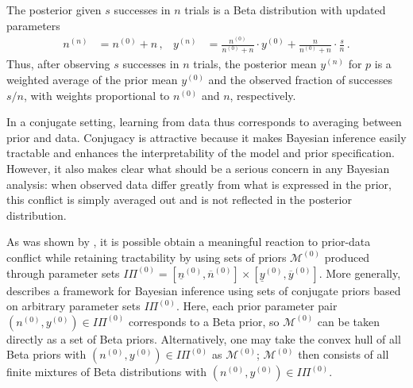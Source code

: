 \documentclass[runningheads,a4paper]{llncs}
\newcommand{\uz}{^{(0)}} %
\newcommand{\un}{^{(n)}} %
\newcommand{\ul}[1]{\underline{#1}}
\newcommand{\ol}[1]{\overline{#1}}
\def\yz{y\uz}
\def\yn{y\un}
\def\yzl{\ul{y}\uz}
\def\yzu{\ol{y}\uz}
\def\nz{n\uz}
\def\nn{n\un}
\def\nzl{\ul{n}\uz}
\def\nzu{\ol{n}\uz}
\def\PZ{I\!\!\Pi\uz}
\def\MZ{\mathcal{M}\uz}
\newcommand{\az}{\alpha\uz}
\newcommand{\bz}{\beta\uz}
\begin{document}
The posterior given $s$ successes in $n$ trials is a Beta distribution with updated parameters
\begin{align}
\nn &= \nz + n\,, &
\yn &= \frac{\nz}{\nz + n} \cdot \yz + \frac{n}{\nz + n} \cdot \frac{s}{n}\,.
\label{eq:nyupdate}
\end{align}
Thus, after observing $s$ successes in $n$ trials,
the posterior mean $\yn$ for $p$ is a weighted average of
the prior mean $\yz$ and the observed fraction of successes $s/n$,
with weights proportional to $\nz$ and $n$, respectively.

In a conjugate setting, learning from data thus corresponds to averaging between prior and data.
Conjugacy is attractive because it makes Bayesian inference easily tractable
and enhances the interpretability of the model and prior specification.
However, it also makes clear what should be a serious concern in any Bayesian analysis:
when observed data differ greatly from what is expressed in the prior,
this conflict is simply averaged out
and is not reflected in the posterior distribution.


As was shown by \cite{Walter2009a}, %
it is possible obtain a meaningful reaction to prior-data conflict while retaining tractability
by using sets of priors $\MZ$ produced through parameter sets $\PZ = [\nzl, \nzu] \times [\yzl, \yzu]$.
More generally, \cite[\S 3.1]{2013:diss-gw} describes a framework for
Bayesian inference using sets of conjugate priors based on arbitrary parameter sets $\PZ$.
Here,
each prior parameter pair $(\nz, \yz) \in \PZ$ corresponds to a Beta prior,
so $\MZ$ can be taken directly as a set of Beta priors.
Alternatively, one may take the convex hull of all Beta priors with $(\nz, \yz) \in \PZ$ as $\MZ$;
$\MZ$ then consists of all finite mixtures of Beta distributions with $(\nz, \yz) \in \PZ$.
\end{document}
